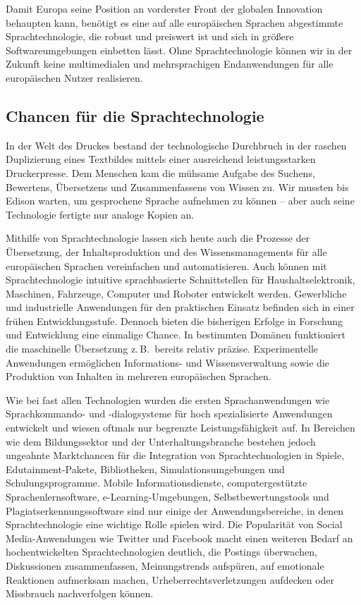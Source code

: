 \begin{multicols}{2}
Damit Europa seine Position an vorderster Front der globalen Innovation behaupten kann, benötigt es eine auf alle europäischen Sprachen abgestimmte Sprachtechnologie, die robust und preiswert ist und sich in größere Softwareumgebungen einbetten lässt. Ohne Sprachtechnologie können wir in der Zukunft keine multimedialen und mehrsprachigen Endanwendungen für alle europäischen Nutzer realisieren.

\subsection{Chancen für die Sprachtechnologie}

In der Welt des Druckes bestand der technologische Durchbruch in der raschen Duplizierung eines Textbildes mittels einer ausreichend leistungsstarken Druckerpresse. Dem Menschen kam die mühsame Aufgabe des Suchens, Bewertens, Übersetzens und Zusammenfassens von Wissen zu. Wir mussten bis Edison warten, um gesprochene Sprache aufnehmen zu können -- aber auch seine Technologie fertigte nur analoge Kopien an.

Mithilfe von Sprachtechnologie lassen sich heute auch die Prozesse der Übersetzung, der Inhaltsproduktion und des Wissensmanagements für alle europäischen Sprachen vereinfachen und automatisieren. Auch können mit Sprachtechnologie intuitive sprachbasierte Schnittstellen für Haushaltselektronik, Maschinen, Fahrzeuge, Computer und Roboter entwickelt werden. Gewerbliche und industrielle Anwendungen für den praktischen Einsatz befinden sich in einer frühen Entwicklungsstufe. Dennoch bieten die bisherigen Erfolge in Forschung und Entwicklung eine einmalige Chance. In bestimmten Domänen funktioniert die maschinelle Übersetzung z.\,B.~bereits relativ präzise. Experimentelle Anwendungen ermöglichen Informations- und Wissensverwaltung sowie die Produktion von Inhalten in mehreren europäischen Sprachen.

Wie bei fast allen Technologien wurden die ersten Sprachanwendungen wie 
Sprachkommando- und -dialogsysteme für 
hoch spezialisierte Anwendungen entwickelt und wiesen oftmals nur begrenzte Leistungsfähigkeit auf. In Bereichen wie dem Bildungssektor und der Unterhaltungsbranche bestehen jedoch ungeahnte Marktchancen für die Integration von Sprachtechnologien in Spiele, Edu\-tain\-ment-Pa\-ke\-te, Bibliotheken, Simulationsumgebungen und Schulungsprogramme. Mobile Informationsdienste, computergestützte Sprachenlernsoftware, e-Learn\-ing-Um\-ge\-bungen, Selbstbewertungstools und Plagiatserkennungssoftware sind nur einige der Anwendungsbereiche, in denen Sprachtechnologie eine wichtige Rolle spielen wird. Die Popularität von Social Me\-dia-An\-wen\-dungen wie Twitter und Facebook macht einen weiteren Bedarf an hochentwickelten Sprachtechnologien deutlich, die Postings überwachen, Diskussionen zusammenfassen, Meinungstrends aufspüren, 
auf emotionale Reaktionen aufmerksam machen, 
Urheberrechtsverletzungen aufdecken oder 
Missbrauch nachverfolgen 
können.


\end{multicols}
